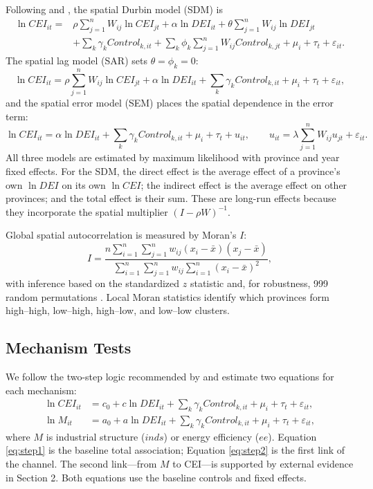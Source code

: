 \documentclass[economies,article,submit,moreauthors]{Definitions/mdpi}
\begin{document}
Following \citet{lesage2009} and \citet{elhorst2014}, the spatial Durbin model (SDM) is
\begin{equation}
\begin{split}
\ln CEI_{it}={}&\rho\sum_{j=1}^{n}W_{ij}\ln CEI_{jt}
+\alpha\ln DEI_{it}
+\theta\sum_{j=1}^{n}W_{ij}\ln DEI_{jt}\\
&+\sum_k\gamma_k Control_{k,it}
+\sum_k\phi_k\sum_{j=1}^{n}W_{ij}Control_{k,jt}
+\mu_i+\tau_t+\varepsilon_{it}.
\end{split}
\label{eq:sdm}
\end{equation}
The spatial lag model (SAR) sets $\theta=\phi_k=0$:
\begin{equation}
\ln CEI_{it}=\rho\sum_{j=1}^{n}W_{ij}\ln CEI_{jt}
+\alpha\ln DEI_{it}+\sum_k\gamma_k Control_{k,it}
+\mu_i+\tau_t+\varepsilon_{it},
\label{eq:sar}
\end{equation}
and the spatial error model (SEM) places the spatial dependence in the error term:
\begin{equation}
\ln CEI_{it}=\alpha\ln DEI_{it}+\sum_k\gamma_k Control_{k,it}
+\mu_i+\tau_t+u_{it},
\qquad
u_{it}=\lambda\sum_{j=1}^{n}W_{ij}u_{jt}+\varepsilon_{it}.
\label{eq:sem}
\end{equation}
All three models are estimated by maximum likelihood with province and year fixed effects. For the SDM, the direct effect is the average effect of a province's own $\ln DEI$ on its own $\ln CEI$; the indirect effect is the average effect on other provinces; and the total effect is their sum. These are long-run effects because they incorporate the spatial multiplier $(I-\rho W)^{-1}$.

Global spatial autocorrelation is measured by Moran's $I$:
\begin{equation}
I=\frac{n\sum_{i=1}^{n}\sum_{j=1}^{n}w_{ij}(x_i-\bar x)(x_j-\bar x)}
{\sum_{i=1}^{n}\sum_{j=1}^{n}w_{ij}\sum_{i=1}^{n}(x_i-\bar x)^2},
\label{eq:moran}
\end{equation}
with inference based on the standardized $z$ statistic and, for robustness, 999 random permutations \citep{moran1950}. Local Moran statistics identify which provinces form high--high, low--high, high--low, and low--low clusters.

\subsection{Mechanism Tests}

We follow the two-step logic recommended by \citet{imai2010,bullock2010} and estimate two equations for each mechanism:
\begin{align}
\ln CEI_{it}&=c_0+c\ln DEI_{it}+\sum_k\gamma_k Control_{k,it}+\mu_i+\tau_t+\varepsilon_{it},
\label{eq:step1}\\
\ln M_{it}&=a_0+a\ln DEI_{it}+\sum_k\gamma_k Control_{k,it}+\mu_i+\tau_t+\varepsilon_{it},
\label{eq:step2}
\end{align}
where $M$ is industrial structure ($inds$) or energy efficiency ($ee$). Equation \eqref{eq:step1} is the baseline total association; Equation \eqref{eq:step2} is the first link of the channel. The second link---from $M$ to CEI---is supported by external evidence in Section 2. Both equations use the baseline controls and fixed effects.
\end{document}
